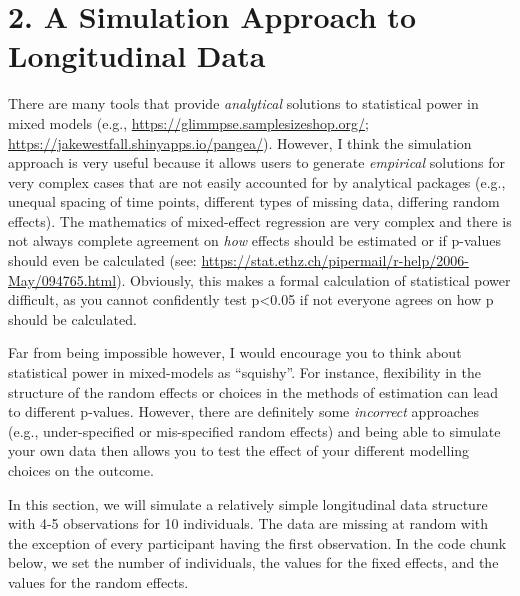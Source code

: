 \documentclass[
]{article}
\begin{document}
\hypertarget{a-simulation-approach-to-longitudinal-data}{%
\section{2. A Simulation Approach to Longitudinal
Data}\label{a-simulation-approach-to-longitudinal-data}}

There are many tools that provide \emph{analytical} solutions to
statistical power in mixed models (e.g.,
\url{https://glimmpse.samplesizeshop.org/};
\url{https://jakewestfall.shinyapps.io/pangea/}). However, I think the
simulation approach is very useful because it allows users to generate
\emph{empirical} solutions for very complex cases that are not easily
accounted for by analytical packages (e.g., unequal spacing of time
points, different types of missing data, differing random effects). The
mathematics of mixed-effect regression are very complex and there is not
always complete agreement on \emph{how} effects should be estimated or
if p-values should even be calculated (see:
\url{https://stat.ethz.ch/pipermail/r-help/2006-May/094765.html}).
Obviously, this makes a formal calculation of statistical power
difficult, as you cannot confidently test p\textless0.05 if not everyone
agrees on how p should be calculated.

Far from being impossible however, I would encourage you to think about
statistical power in mixed-models as ``squishy''. For instance,
flexibility in the structure of the random effects or choices in the
methods of estimation can lead to different p-values. However, there are
definitely some \emph{incorrect} approaches (e.g., under-specified or
mis-specified random effects) and being able to simulate your own data
then allows you to test the effect of your different modelling choices
on the outcome.

In this section, we will simulate a relatively simple longitudinal data
structure with 4-5 observations for 10 individuals. The data are missing
at random with the exception of every participant having the first
observation. In the code chunk below, we set the number of individuals,
the values for the fixed effects, and the values for the random effects.
\end{document}
